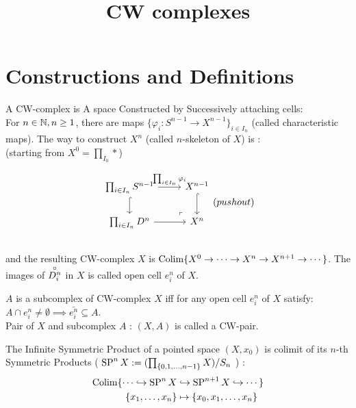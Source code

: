 


    \title{CW complexes}
    \author{{\color{pink}{Cloudi}}{\color{Aquamarine}{fold}}}
    \maketitle
    \newpage

    \setcounter{section}{-1}

    \section{Constructions and Definitions}
    \begin{defn}
        A CW-complex is A space Constructed by Successively attaching cells:\\
        For $n \in \mathbb N, n \geq 1$, there are maps $\{ \varphi_i : S^{n-1} \to X^{n-1} \}_{i \in I_n}$
        (called characteristic maps). The way to construct $X^n$ (called $n$-skeleton of $X$) is :\\
        (starting from $X^0 = \prod_{I_0} \ast $)

        \[\begin{tikzcd}
            {\prod_{i \in I_n}S^{n-1}} & {X^{n-1}} \\
            {\prod_{i\in I_n}D^n} & {X^n}
            \arrow[hook, from=1-1, to=2-1]
            \arrow[from=2-1, to=2-2]
            \arrow["{\prod_{i \in I_n}\varphi_i}", from=1-1, to=1-2]
            \arrow[hook, from=1-2, to=2-2]
            \arrow["\lrcorner"{anchor=center, pos=0.125, rotate=180}, draw=none, from=2-2, to=1-1]
        \end{tikzcd}(pushout)\]\\
        and the resulting CW-complex $X$ is $\operatorname{Colim} \{X^0 \to \cdots \to X^n \to X^{n+1} \to \cdots \}$.
        The images of $\overset{\circ}{D^n_i}$ in $X$ is called open cell $e^n_i$ of $X$.
    \end{defn}

    \begin{defn}
        $A$ is a subcomplex of CW-complex $X$ iff for any open cell $e^n_i$ of $X$ satisfy:
        $A \cap e^n_i \neq \emptyset \implies \bar{e^n_i} \subseteq A $.\\
        Pair of $X$ and subcomplex $A$ : $(X,A)$ is called a CW-pair.
    \end{defn}

    \begin{defn}
        The Infinite Symmetric Product of a pointed space $(X,x_0)$ is colimit of its $n$-th Symmetric Products
        ( $\operatorname{SP}^n X := (\prod_{\{0,1,\dots , n-1\}} X ) / S_n$ ) :\\
        \begin{align*}
            \operatorname{Colim} \{\dots \hookrightarrow \operatorname{SP}^{n} X & \hookrightarrow \operatorname{SP}^{n+1} X \hookrightarrow \cdots \} \\
            \{x_1, \dots, x_n\} & \mapsto \{x_0, x_1, \dots, x_n\}    
        \end{align*}
    \end{defn}



